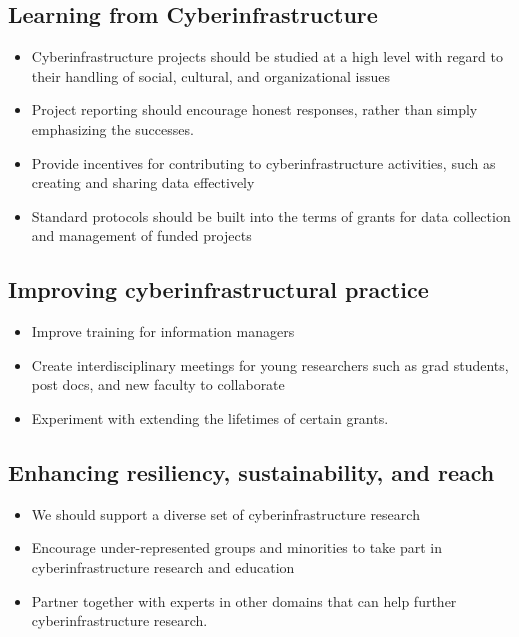 \documentclass[11pt]{article}
\begin{document}
\subsection{Learning from Cyberinfrastructure}
\begin{itemize}
\item Cyberinfrastructure projects should be studied at a high level with regard to their handling of social, cultural, and organizational issues
\item Project reporting should encourage honest responses, rather than simply emphasizing the successes.
\item Provide incentives for contributing to cyberinfrastructure activities, such as creating and sharing data effectively
\item Standard protocols should be built into the terms of grants for data collection and management of funded projects
\end{itemize}

\subsection{Improving cyberinfrastructural practice}
\begin{itemize}
\item Improve training for information managers
\item Create interdisciplinary meetings for young researchers such as grad students, post docs, and new faculty to collaborate
\item Experiment with extending the lifetimes of certain grants.
\end{itemize}

\subsection{Enhancing resiliency, sustainability, and reach}

\begin{itemize}
\item We should support a diverse set of cyberinfrastructure research
\item Encourage under-represented groups and minorities to take part in cyberinfrastructure research and education
\item Partner together with experts in other domains that can help further cyberinfrastructure research.
\end{itemize}

\newpage
\end{document}
